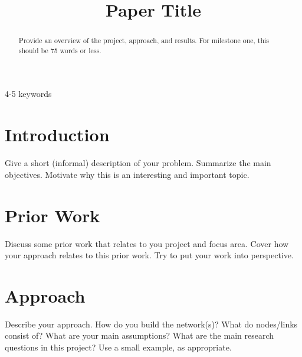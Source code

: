 \documentclass[conference]{IEEEtran}
\begin{document}
\title{Paper Title}

\author{
\and
{}
}

\maketitle

\begin{abstract}
Provide an overview of the project, approach, and results. For milestone one, this should be 75 words or less.
\end{abstract}

\begin{IEEEkeywords}
4-5 keywords
\end{IEEEkeywords}

\section{Introduction}
 Give a short (informal) description of your problem. Summarize the main objectives. Motivate why this is an interesting and important topic.

\section{Prior Work}
Discuss some prior work that relates to you project and focus area. Cover how your approach relates to this prior work. Try to put your work into perspective.


\section{Approach}
Describe your approach. How do you build the network(s)? What do nodes/links consist of? What are your main assumptions? What are the main research questions in this project? Use a small example, as appropriate.
\end{document}
